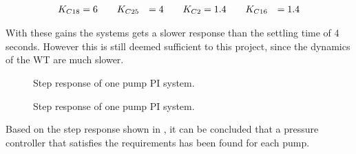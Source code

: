 \begin{equation}
\centering
	\begin{split}
	K_{C18} &= 6 \hspace{20pt} K_{C25} &= 4 \hspace{20pt} K_{C2} &= 1.4 \hspace{20pt} K_{C16} &= 1.4
	\end{split}
	\label{eq:NEW_PI_GAINS}
\end{equation}

With these gains the systems gets a slower response than the settling time of 4 seconds. However this is still deemed sufficient to this project, since the dynamics of the WT are much slower.

\begin{figure}[H]
\centering

\caption{Step response of one pump PI system.}
\label{fig:Tikz_PI_PUMP_GAIN}
\end{figure}


\begin{figure}[H]
\centering

\caption{Step response of one pump PI system.}
\label{fig:Tikz_NEW_PI_PUMP_GAIN}
\end{figure}

Based on the step response shown in , it can be concluded that a pressure controller that satisfies the requirements has been found for each pump. 

